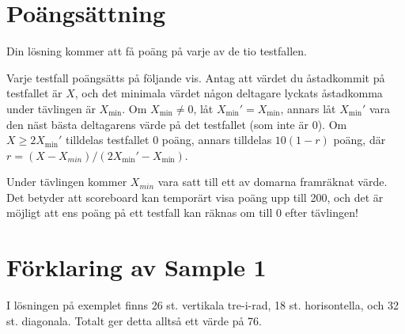 \section*{Poängsättning}
Din lösning kommer att få poäng på varje av de tio testfallen.

Varje testfall poängsätts på följande vis.
Antag att värdet du åstadkommit på testfallet är $X$, och
det minimala värdet någon deltagare lyckats åstadkomma under tävlingen är $X_{\min}$.
Om $X_{\min} \ne 0$, låt $X_{\min}' = X_{\min}$, annars låt $X_{\min}'$ vara den näst bästa deltagarens värde på det testfallet (som inte är 0).
Om $X \ge 2X_{\min}'$ tilldelas testfallet $0$ poäng, annars tilldelas $10(1 - r)$ poäng, där $r = (X - X_{min}) / (2X_{\min}' - X_{\min})$.

Under tävlingen kommer $X_{min}$ vara satt till ett av domarna framräknat värde.
Det betyder att scoreboard kan temporärt visa poäng upp till 200, och det är möjligt att ens poäng på ett testfall kan räknas om till 0 efter tävlingen!

\section*{Förklaring av Sample 1}
I lösningen på exemplet finns 26 st. vertikala tre-i-rad, 18 st. horisontella, och 32 st. diagonala.
Totalt ger detta alltså ett värde på 76.
